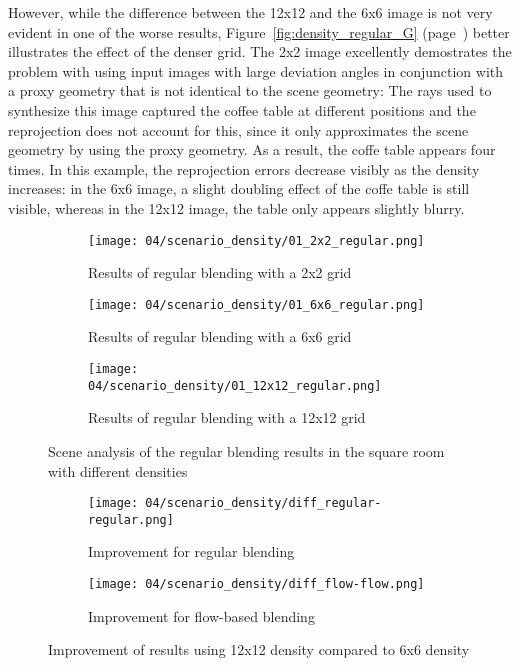 However, while the difference between the 12x12 and the 6x6 image is not very evident in one of the worse results, Figure~\ref{fig:density_regular_G} (page~\pageref{fig:density_regular_G}) better illustrates the effect of the denser grid. The 2x2 image excellently demostrates the problem with using input images with large deviation angles in conjunction with a proxy geometry that is not identical to the scene geometry: The rays used to synthesize this image captured the coffee table at different positions and the reprojection does not account for this, since it only approximates the scene geometry by using the proxy geometry. As a result, the coffe table appears four times. In this example, the reprojection errors decrease visibly as the density increases: in the 6x6 image, a slight doubling effect of the coffe table is still visible, whereas in the 12x12 image, the table only appears slightly blurry.

\begin{figure}
\centering
    \hfill
    \begin{subfigure}[b]{0.32\textwidth}
            \centering
            \texttt{[image: 04/scenario\_density/01\_2x2\_regular.png]}
            \caption{Results of regular blending with a 2x2 grid}
    \end{subfigure}
    \hfill
    \begin{subfigure}[b]{0.32\textwidth}
            \centering
            \texttt{[image: 04/scenario\_density/01\_6x6\_regular.png]}
            \caption{Results of regular blending with a 6x6 grid}
    \end{subfigure}
    \hfill
    \begin{subfigure}[b]{0.32\textwidth}
            \centering
            \texttt{[image: 04/scenario\_density/01\_12x12\_regular.png]}
            \caption{Results of regular blending with a 12x12 grid}
    \end{subfigure}
    \hfill
  \caption{Scene analysis of the regular blending results in the square room with different densities} \label{fig:density_regular_scene_analysis}
\end{figure}

\begin{figure}
\centering
    \hfill
    \begin{subfigure}[b]{0.45\textwidth}
            \centering
            \texttt{[image: 04/scenario\_density/diff\_regular-regular.png]}
            \caption{Improvement for regular blending}
    \end{subfigure}
    \hfill
    \begin{subfigure}[b]{0.45\textwidth}
            \centering
            \texttt{[image: 04/scenario\_density/diff\_flow-flow.png]}
            \caption{Improvement for flow-based blending}
    \end{subfigure}
    \hfill
  \caption{Improvement of results using 12x12 density compared to 6x6 density} \label{fig:dens_diff_6x6_12x12}
\end{figure}


